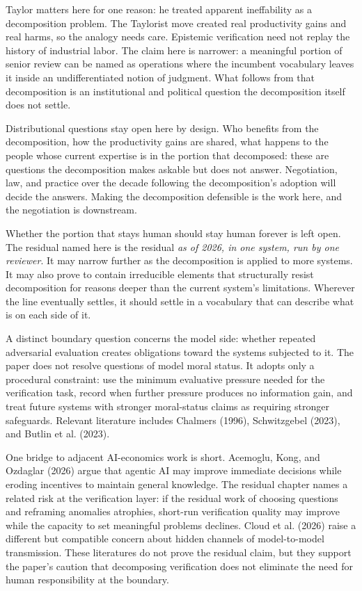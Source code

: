 \documentclass[
  11pt,
]{article}
\begin{document}
Taylor matters here for one reason: he treated apparent ineffability as a
decomposition problem. The Taylorist move created real productivity gains
and real harms, so the analogy needs care. Epistemic verification need not
replay the history of industrial labor. The claim here is narrower: a
meaningful portion of senior review can be named as operations where the
incumbent vocabulary leaves it inside an undifferentiated notion of
judgment. What follows from that decomposition is an institutional and
political question the decomposition itself does not settle.

Distributional questions stay open here by design. Who benefits
from the decomposition, how the productivity gains are shared, what
happens to the people whose current expertise is in the portion that
decomposed: these are questions the decomposition makes askable but does
not answer. Negotiation, law, and practice over the decade following the
decomposition's adoption will decide the answers. Making the decomposition
defensible is the work here, and the negotiation is downstream.

Whether the portion that stays human should stay human forever is left
open. The residual named here is the residual \emph{as of 2026, in one
system, run by one reviewer}. It may narrow further as the decomposition
is applied to more systems. It may also prove to contain irreducible
elements that structurally resist decomposition for reasons deeper than
the current system's limitations. Wherever the line eventually settles, it
should settle in a vocabulary that can describe what is on each side of
it.

A distinct boundary question concerns the model side: whether repeated
adversarial evaluation creates obligations toward the systems subjected to
it. The paper does not resolve questions of model moral status. It adopts
only a procedural constraint: use the minimum evaluative pressure needed
for the verification task, record when further pressure produces no
information gain, and treat future systems with stronger moral-status
claims as requiring stronger safeguards. Relevant literature includes
Chalmers (1996), Schwitzgebel (2023), and Butlin et al. (2023).

One bridge to adjacent AI-economics work is short. Acemoglu, Kong, and
Ozdaglar (2026) argue that agentic AI may improve immediate decisions
while eroding incentives to maintain general knowledge. The residual
chapter names a related risk at the verification layer: if the residual
work of choosing questions and reframing anomalies atrophies, short-run
verification quality may improve while the capacity to set meaningful
problems declines. Cloud et al. (2026) raise a different but compatible
concern about hidden channels of model-to-model transmission. These
literatures do not prove the residual claim, but they support the paper's
caution that decomposing verification does not eliminate the need for
human responsibility at the boundary.
\end{document}

